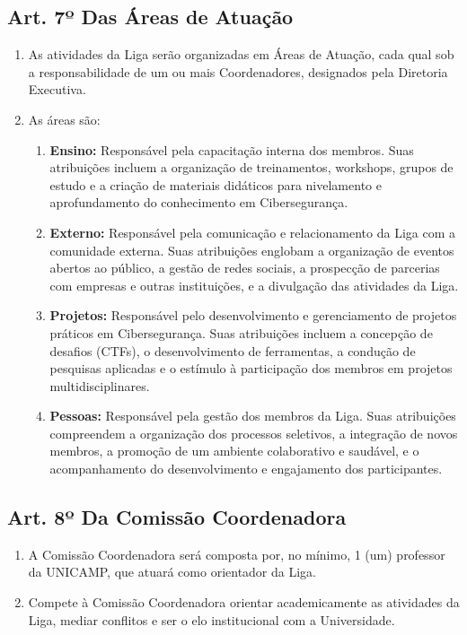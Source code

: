 \documentclass[12pt, a4paper]{article}
\begin{document}
\subsection{Art. 7º Das Áreas de Atuação}
\begin{enumerate}[label=\S \arabic*.]
    \item As atividades da Liga serão organizadas em Áreas de Atuação, cada qual sob a responsabilidade de um ou mais Coordenadores, designados pela Diretoria Executiva.
    \item As áreas são:
    \begin{enumerate}[label=\alph*)]
        \item \textbf{Ensino:} Responsável pela capacitação interna dos membros. Suas atribuições incluem a organização de treinamentos, workshops, grupos de estudo e a criação de materiais didáticos para nivelamento e aprofundamento do conhecimento em Cibersegurança.
        \item \textbf{Externo:} Responsável pela comunicação e relacionamento da Liga com a comunidade externa. Suas atribuições englobam a organização de eventos abertos ao público, a gestão de redes sociais, a prospecção de parcerias com empresas e outras instituições, e a divulgação das atividades da Liga.
        \item \textbf{Projetos:} Responsável pelo desenvolvimento e gerenciamento de projetos práticos em Cibersegurança. Suas atribuições incluem a concepção de desafios (CTFs), o desenvolvimento de ferramentas, a condução de pesquisas aplicadas e o estímulo à participação dos membros em projetos multidisciplinares.
        \item \textbf{Pessoas:} Responsável pela gestão dos membros da Liga. Suas atribuições compreendem a organização dos processos seletivos, a integração de novos membros, a promoção de um ambiente colaborativo e saudável, e o acompanhamento do desenvolvimento e engajamento dos participantes.
    \end{enumerate}
\end{enumerate}

\subsection{Art. 8º Da Comissão Coordenadora}
\begin{enumerate}[label=\S \arabic*.]
    \item A Comissão Coordenadora será composta por, no mínimo, 1 (um) professor da UNICAMP, que atuará como orientador da Liga.
    \item Compete à Comissão Coordenadora orientar academicamente as atividades da Liga, mediar conflitos e ser o elo institucional com a Universidade.
\end{enumerate}
\end{document}
